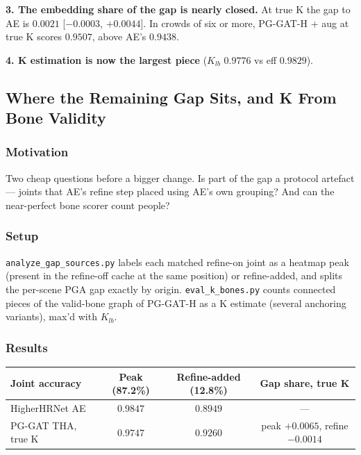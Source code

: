 \textbf{3. The embedding share of the gap is nearly closed.} At true K the gap to AE is $0.0021$ [$-0.0003$, $+0.0044$]. In crowds of six or more, PG-GAT-H + aug at true K scores $0.9507$, above AE's $0.9438$.

\textbf{4. K estimation is now the largest piece} ($K_{lb}$ $0.9776$ vs eff $0.9829$).

\subsection{Where the Remaining Gap Sits, and K From Bone Validity}

\subsubsection{Motivation}

Two cheap questions before a bigger change. Is part of the gap a protocol artefact --- joints that AE's refine step placed using AE's own grouping? And can the near-perfect bone scorer count people?

\subsubsection{Setup}

\texttt{analyze\_gap\_sources.py} labels each matched refine-on joint as a heatmap peak (present in the refine-off cache at the same position) or refine-added, and splits the per-scene PGA gap exactly by origin.
\texttt{eval\_k\_bones.py} counts connected pieces of the valid-bone graph of PG-GAT-H as a K estimate (several anchoring variants), max'd with $K_{lb}$.

\subsubsection{Results}

\begin{tabular}{lccc}
\hline
\textbf{Joint accuracy} & \textbf{Peak (87.2\%)} & \textbf{Refine-added (12.8\%)} & \textbf{Gap share, true K} \\
\hline
HigherHRNet AE         & $\mathbf{0.9847}$ & $0.8949$ & --- \\
PG-GAT THA, true K     & $0.9747$ & $\mathbf{0.9260}$ & peak $+0.0065$, refine $-0.0014$ \\
\hline
\end{tabular}

\vspace{0.5em}

